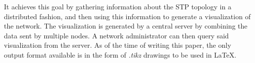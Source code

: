 It achieves this goal by gathering information about the STP topology in a distributed fashion, and then using this information to generate a visualization of the network.
The visualization is generated by a central server by combining the data sent by multiple nodes.
A network administrator can then query said visualization from the server.
As of the time of writing this paper, the only output format available is in the form of \textit{.tikz} drawings to be used in \LaTeX.
